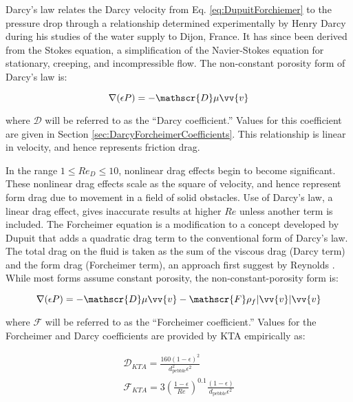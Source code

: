 \documentclass[10pt]{article}
\newcounter{subsubsubsection}[subsubsection]
\numberwithin{equation}{section} %
\begin{document}
\label{sec:Darcy}

Darcy's law relates the Darcy velocity from Eq. \eqref{eq:DupuitForchiemer} to the pressure drop through a relationship determined experimentally by Henry Darcy during his studies of the water supply to Dijon, France. It has since been derived from the Stokes equation, a simplification of the Navier-Stokes equation for stationary, creeping, and incompressible flow. The non-constant porosity form of Darcy's law is:

\begin{equation}
\label{eq:DarcysLaw_NonconstantPorosity2}
\nabla(\epsilon P)=-\mathscr{D}\mu\vv{v}
\end{equation}

where \(\mathscr{D}\) will be referred to as the ``Darcy coefficient.'' Values for this coefficient are given in Section \ref{sec:DarcyForcheimerCoefficients}. This relationship is linear in velocity, and hence represents friction drag. 

\label{sec:ForcheimerEquation}

In the range \(1\leq Re_D\leq 10\), nonlinear drag effects begin to become significant. These nonlinear drag effects scale as the square of velocity, and hence represent form drag due to movement in a field of solid obstacles. Use of Darcy's law, a linear drag effect, gives inaccurate results at higher \(Re\) unless another term is included. The Forcheimer equation is a modification to a concept developed by Dupuit that adds a quadratic drag term to the conventional form of Darcy's law. The total drag on the fluid is taken as the sum of the viscous drag (Darcy term) and the form drag (Forcheimer term), an approach first suggest by Reynolds \cite{ergun}. While most forms assume constant porosity, the non-constant-porosity form is:

\begin{equation}
\label{eq:GeneralForcheimer}
\nabla (\epsilon P)=-\mathscr{D}\mu\vv{v}-\mathscr{F}\rho_f|\vv{v}|\vv{v}
\end{equation}

where \(\mathscr{F}\) will be referred to as the ``Forcheimer coefficient.'' Values for the Forcheimer and Darcy coefficients are provided by KTA empirically as:

\begin{equation}
\begin{aligned}
\mathscr{D}_{KTA}=\frac{160(1-\epsilon)^2}{d_{\textrm{pebble}}^2\epsilon^2}\\
\mathscr{F}_{KTA}=3\left(\frac{1-\epsilon}{Re}\right)^{0.1}\frac{(1-\epsilon)}{d_{\textrm{pebble}}\epsilon^2}\\
\end{aligned}
\end{equation}
\end{document}
